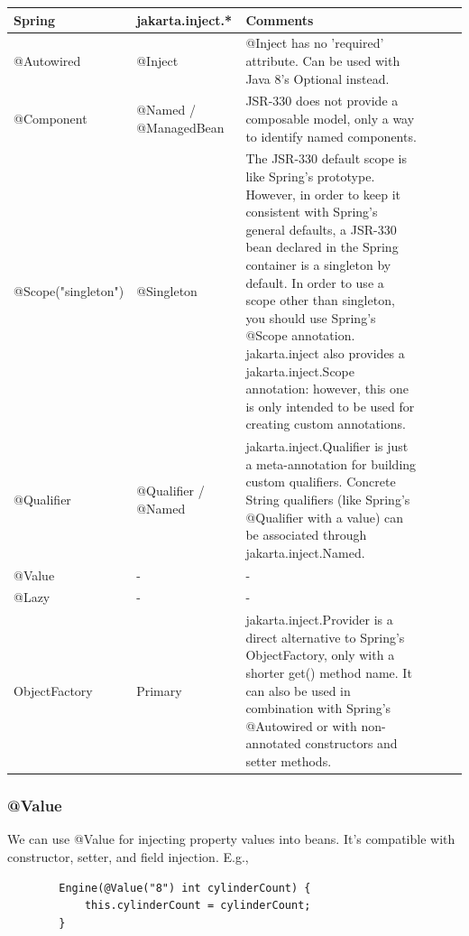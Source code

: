 \documentclass{scrartcl}
\begin{document}
\begin{table}[hbt!]
\begin{tabular}{ |l p{.2\linewidth} | l p{.2\linewidth} | l p{.4.5\linewidth}|}
    \hline
    Spring&  jakarta.inject.*&  Comments\\
    \hline
    @Autowired & @Inject & @Inject has no 'required' attribute. Can be used with Java 8's Optional instead.\\
    \hline
    @Component&  @Named / @ManagedBean&  JSR-330 does not provide a composable model, only a way to identify named components.\\
    \hline
    @Scope("singleton")&  @Singleton&  The JSR-330 default scope is like     Spring’s prototype. However, in order to keep it consistent with
    Spring’s general defaults, a JSR-330 bean declared in the Spring
    container is a singleton by default. In order to use a scope
    other than singleton, you should use Spring’s @Scope
    annotation. jakarta.inject also provides a jakarta.inject.Scope    annotation: however, this one is only intended to be used for
    creating custom annotations.\\
    \hline
    @Qualifier&  @Qualifier / @Named&  jakarta.inject.Qualifier is just a meta-annotation for building custom qualifiers. Concrete
    String qualifiers (like Spring’s @Qualifier with a value) can be
    associated through jakarta.inject.Named.\\
    \hline
    @Value&  -&  -\\
    \hline
    @Lazy&  -&  -\\
    \hline
    ObjectFactory&  Primary&  jakarta.inject.Provider is a  direct alternative to Spring’s ObjectFactory, only with a
    shorter get() method name. It can also be used in combination
    with Spring’s @Autowired or with non-annotated constructors and
    setter methods.\\
    \hline
\end{tabular}
\end{table}

\subsubsection{@Value}

    We can use @Value for injecting property values into beans. It’s compatible with constructor, setter, and field injection. E.g.,

    \begin{lstlisting}
        Engine(@Value("8") int cylinderCount) {
            this.cylinderCount = cylinderCount;
        }
    \end{lstlisting}
\end{document}

